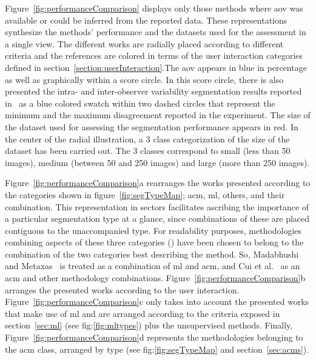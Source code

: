 \documentclass[authoryear,preprint,review,12pt]{elsarticle}
\begin{document}

Figure~\ref{fig:performanceComparison} displays only those methods where \ac{aov} was available or could be inferred from the reported data. These representations synthesize the methods' performance and the datasets used for the assessment in a single view. The different works are radially placed according to different criteria and the references are colored in terms of the user interaction categories defined in section~\ref{section:userInteraction}.The \ac{aov} appears in blue in percentage as well as graphically within a score circle. In this score circle, there is also presented the intra- and inter-observer variability segmentation results reported in~\cite{gerard2013} as a blue colored swatch within two dashed circles that represent the minimum and the maximum disagreement reported in the experiment.
The size of the dataset used for assessing the segmentation performance appears in red. In the center of the radial illustration, a 3 class categorization of the size of the dataset has been carried out. The 3 classes correspond to small (less than 50 images), medium (between 50 and 250 images) and large (more than 250 images).

Figure~\ref{fig:performanceComparison}a rearranges the works presented according to the categories shown in figure~\ref{fig:segTypeMap}; \ac{acm}, \ac{ml}, others, and their combination. 
This representation in sectors facilitates ascribing the importance of a particular segmentation type at a glance, since combinations of these are placed contiguous to the unaccompanied type. For readability purposes, methodologies combining aspects of these three categories (\cite{Madabhushi:2003p6036,Cui:2009p14325}) have been chosen to belong to the combination of the two categories best describing the method. 
So, Madabhushi and Metaxas~\cite{Madabhushi:2003p6036} is treated as a combination of \ac{ml} and \ac{acm}, and Cui et al.~\cite{Cui:2009p14325} as an \ac{acm} and other methodology combinations.
Figure~\ref{fig:performanceComparison}b arranges the presented works according to the user interaction. 
Figure~\ref{fig:performanceComparison}c only takes into account the presented works that make use of \ac{ml} and are arranged according to the criteria exposed in section~\ref{sec:ml} (see fig:\ref{fig:mltypes}) plus the unsupervised methods. Finally, Figure~\ref{fig:performanceComparison}d represents the methodologies belonging to the \ac{acm} class, arranged by type (see fig:\ref{fig:segTypeMap} and section~\ref{sec:acms}). 
\end{document}
